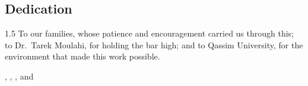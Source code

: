 \begin{center}
\section*{Dedication}
\end{center}

\begin{spacing}{1.5}
To our families, whose patience and encouragement carried us through this; to Dr.\ Tarek Moulahi, for holding the bar high; and to Qassim University, for the environment that made this work possible.
\end{spacing}

\begin{flushright}
{\firststudentname}, {\secondstudentname}, {\thirdstudentname}, and {\fourthstudentname}
\end{flushright}

\clearpage
\vspace*{2cm}
